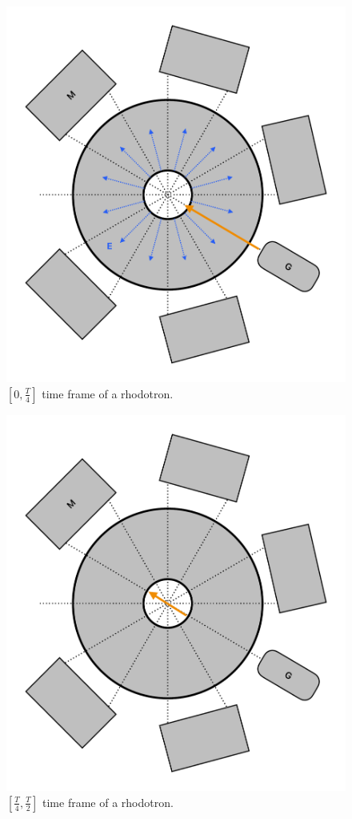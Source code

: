 \documentclass[a4paper,oneside,12pt]{report}
\numberwithin{equation}{chapter}
\begin{document}
\begin{figure}[H]
    \centering
    \includegraphics[width=\textwidth]{./figures/illustrations/rhod1.pdf}
    \caption{$[0, \frac{T}{4}]$ time frame of a rhodotron.}
    \label{fig:rhod_cycle_1}
\end{figure}
\begin{figure}[H]
    \centering
    \includegraphics[width=\textwidth]{./figures/illustrations/rhod2.pdf}
    \caption{$[\frac{T}{4}, \frac{T}{2}]$ time frame of a rhodotron.}
    \label{fig:rhod_cycle_2}
\end{figure}
\end{document}
